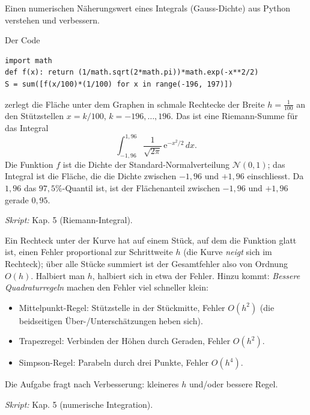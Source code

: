 

Einen numerischen Näherungswert eines Integrals (Gauss-Dichte) aus Python
verstehen und verbessern.

\begin{werkzeugkasten}
Der Code
\begin{verbatim}
import math
def f(x): return (1/math.sqrt(2*math.pi))*math.exp(-x**2/2)
S = sum([f(x/100)*(1/100) for x in range(-196, 197)])
\end{verbatim}
zerlegt die Fläche unter dem Graphen in schmale Rechtecke der Breite
$h=\frac1{100}$ an den Stützstellen $x=k/100$, $k=-196,\ldots,196$. Das
ist eine Riemann-Summe für das Integral
\begin{equation*}
  \int_{-1{,}96}^{1{,}96}\frac{1}{\sqrt{2\pi}}\,\mathrm e^{-x^2/2}\,dx .
\end{equation*}
Die Funktion $f$ ist die Dichte der Standard-Normalverteilung
$\mathcal N(0,1)$; das Integral ist die Fläche, die die Dichte zwischen
$-1{,}96$ und $+1{,}96$ einschliesst. Da $1{,}96$ das $97{,}5\%$-Quantil
ist, ist der Flächenanteil zwischen $-1{,}96$ und $+1{,}96$ gerade $0{,}95$.

\textit{Skript:} Kap. 5 (Riemann-Integral).
\end{werkzeugkasten}

\begin{werkzeugkasten}
Ein Rechteck unter der Kurve hat auf einem Stück, auf dem die Funktion
glatt ist, einen Fehler proportional zur Schrittweite $h$ (die Kurve
\emph{neigt} sich im Rechteck); über alle Stücke summiert ist der
Gesamtfehler also von Ordnung $O(h)$. Halbiert man $h$, halbiert sich in
etwa der Fehler. Hinzu kommt: \emph{Bessere Quadraturregeln} machen den
Fehler viel schneller klein:
\begin{itemize}
  \item Mittelpunkt-Regel: Stützstelle in der Stückmitte, Fehler
        $O(h^2)$ (die beidseitigen Über-/Unterschätzungen heben sich).
  \item Trapezregel: Verbinden der Höhen durch Geraden, Fehler $O(h^2)$.
  \item Simpson-Regel: Parabeln durch drei Punkte, Fehler $O(h^4)$.
\end{itemize}
Die Aufgabe fragt nach Verbesserung: kleineres $h$ und/oder bessere Regel.

\textit{Skript:} Kap. 5 (numerische Integration).
\end{werkzeugkasten}

